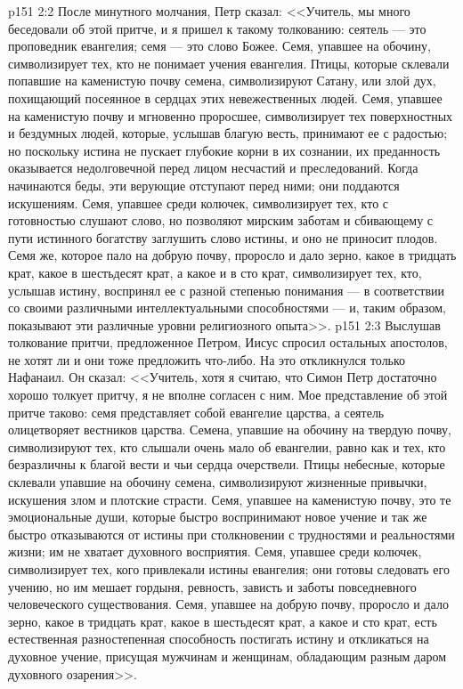 \vs p151 2:2 После минутного молчания, Петр сказал: <<Учитель, мы много беседовали об этой притче, и я пришел к такому толкованию: сеятель --- это проповедник евангелия; семя --- это слово Божее. Семя, упавшее на обочину, символизирует тех, кто не понимает учения евангелия. Птицы, которые склевали попавшие на каменистую почву семена, символизируют Сатану, или злой дух, похищающий посеянное в сердцах этих невежественных людей. Семя, упавшее на каменистую почву и мгновенно проросшее, символизирует тех поверхностных и бездумных людей, которые, услышав благую весть, принимают ее с радостью; но поскольку истина не пускает глубокие корни в их сознании, их преданность оказывается недолговечной перед лицом несчастий и преследований. Когда начинаются беды, эти верующие отступают перед ними; они поддаются искушениям. Семя, упавшее среди колючек, символизирует тех, кто с готовностью слушают слово, но позволяют мирским заботам и сбивающему с пути истинного богатству заглушить слово истины, и оно не приносит плодов. Семя же, которое пало на добрую почву, проросло и дало зерно, какое в тридцать крат, какое в шестьдесят крат, а какое и в сто крат, символизирует тех, кто, услышав истину, воспринял ее с разной степенью понимания --- в соответствии со своими различными интеллектуальными способностями --- и, таким образом, показывают эти различные уровни религиозного опыта>>.
\vs p151 2:3 Выслушав толкование притчи, предложенное Петром, Иисус спросил остальных апостолов, не хотят ли и они тоже предложить что\hyp{}либо. На это откликнулся только Нафанаил. Он сказал: <<Учитель, хотя я считаю, что Симон Петр достаточно хорошо толкует притчу, я не вполне согласен с ним. Мое представление об этой притче таково: семя представляет собой евангелие царства, а сеятель олицетворяет вестников царства. Семена, упавшие на обочину на твердую почву, символизируют тех, кто слышали очень мало об евангелии, равно как и тех, кто безразличны к благой вести и чьи сердца очерствели. Птицы небесные, которые склевали упавшие на обочину семена, символизируют жизненные привычки, искушения злом и плотские страсти. Семя, упавшее на каменистую почву, это те эмоциональные души, которые быстро воспринимают новое учение и так же быстро отказываются от истины при столкновении с трудностями и реальностями жизни; им не хватает духовного восприятия. Семя, упавшее среди колючек, символизирует тех, кого привлекали истины евангелия; они готовы следовать его учению, но им мешает гордыня, ревность, зависть и заботы повседневного человеческого существования. Семя, упавшее на добрую почву, проросло и дало зерно, какое в тридцать крат, какое в шестьдесят крат, а какое и сто крат, есть естественная разностепенная способность постигать истину и откликаться на духовное учение, присущая мужчинам и женщинам, обладающим разным даром духовного озарения>>.
